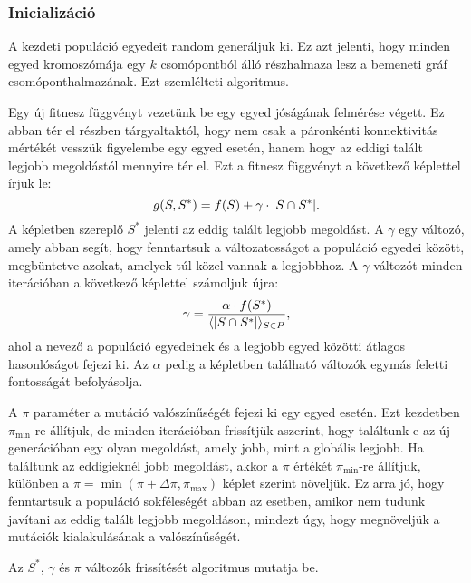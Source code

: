 \subsubsection{Inicializáció}
A kezdeti populáció egyedeit random generáljuk ki.
Ez azt jelenti, hogy minden egyed kromoszómája egy $k$ csomópontból álló részhalmaza lesz a bemeneti gráf csomóponthalmazának.
Ezt szemlélteti  algoritmus.


Egy új fitnesz függvényt vezetünk be egy egyed jóságának felmérése végett.
Ez abban tér el  részben tárgyaltaktól,
hogy nem csak a páronkénti konnektivitás mértékét vesszük figyelembe egy egyed esetén,
hanem hogy az eddigi talált legjobb megoldástól mennyire tér el.
Ezt a fitnesz függvényt a következő képlettel írjuk le:
\begin{equation}\label{eqn:SOCNDP_GA_FITNESZ_FUNCTION}
  g(S, S^{*}) = f(S) + \gamma \cdot \lvert S \cap S^{*}\rvert.
\end{equation}
A képletben szereplő $S^{*}$ jelenti az eddig talált legjobb megoldást.
A $\gamma$ egy változó, amely abban segít, hogy fenntartsuk a változatosságot a populáció egyedei között,
megbüntetve azokat, amelyek túl közel vannak a legjobbhoz.
A $\gamma$ változót minden iterációban a következő képlettel számoljuk újra:
\begin{equation}\label{eqn:SOCNDP_GA_GAMMA}
  \gamma = \frac{\alpha \cdot f(S^{*})}{\langle \lvert S \cap S^{*}\rvert \rangle_{S \in P}},
\end{equation}
ahol a nevező a populáció egyedeinek és a legjobb egyed közötti átlagos hasonlóságot fejezi ki.
Az $\alpha$ pedig a képletben található változók egymás feletti fontosságát befolyásolja.

A $\pi$ paraméter a mutáció valószínűségét fejezi ki egy egyed esetén.
Ezt kezdetben $\pi_{\min}$-re állítjuk, de minden iterációban frissítjük aszerint,
hogy találtunk-e az új generációban egy olyan megoldást, amely jobb, mint a globális legjobb.
Ha találtunk az eddigieknél jobb megoldást, akkor a $\pi$ értékét $\pi_{\min}$-re állítjuk,
különben a $\pi = \min \left(\pi + \Delta \pi, \pi_{\max} \right)$ képlet szerint növeljük.
Ez arra jó, hogy fenntartsuk a populáció sokféleségét abban az esetben,
amikor nem tudunk javítani az eddig talált legjobb megoldáson,
mindezt úgy, hogy megnöveljük a mutációk kialakulásának a valószínűségét.

Az $S^{*}$, $\gamma$ és $\pi$ változók frissítését  algoritmus mutatja be.



